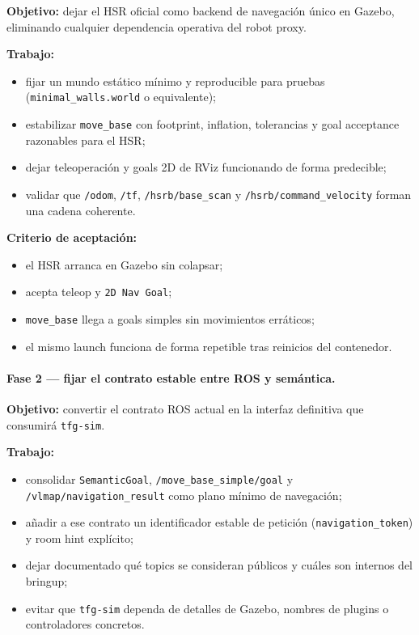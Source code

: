 \documentclass[11pt,a4paper]{article}
\begin{document}
\textbf{Objetivo:} dejar el HSR oficial como backend de navegación único en
Gazebo, eliminando cualquier dependencia operativa del robot proxy.

\textbf{Trabajo:}
\begin{itemize}
  \item fijar un mundo estático mínimo y reproducible para pruebas
        (\texttt{minimal\_walls.world} o equivalente);
  \item estabilizar \texttt{move\_base} con footprint, inflation, tolerancias y
        goal acceptance razonables para el HSR;
  \item dejar teleoperación y goals 2D de RViz funcionando de forma predecible;
  \item validar que \texttt{/odom}, \texttt{/tf}, \texttt{/hsrb/base\_scan} y
        \texttt{/hsrb/command\_velocity} forman una cadena coherente.
\end{itemize}

\textbf{Criterio de aceptación:}
\begin{itemize}
  \item el HSR arranca en Gazebo sin colapsar;
  \item acepta teleop y \texttt{2D Nav Goal};
  \item \texttt{move\_base} llega a goals simples sin movimientos erráticos;
  \item el mismo launch funciona de forma repetible tras reinicios del
        contenedor.
\end{itemize}

\paragraph{Fase 2 --- fijar el contrato estable entre ROS y semántica.}

\textbf{Objetivo:} convertir el contrato ROS actual en la interfaz definitiva
que consumirá \texttt{tfg-sim}.

\textbf{Trabajo:}
\begin{itemize}
  \item consolidar \texttt{SemanticGoal}, \texttt{/move\_base\_simple/goal} y
        \texttt{/vlmap/navigation\_result} como plano mínimo de navegación;
  \item añadir a ese contrato un identificador estable de petición
        (\texttt{navigation\_token}) y room hint explícito;
  \item dejar documentado qué topics se consideran públicos y cuáles son
        internos del bringup;
  \item evitar que \texttt{tfg-sim} dependa de detalles de Gazebo, nombres de
        plugins o controladores concretos.
\end{itemize}
\end{document}
